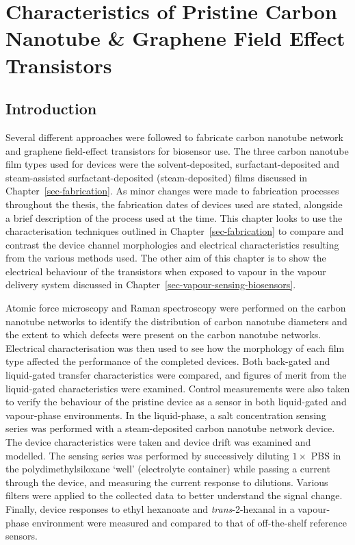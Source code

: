 \documentclass[
  a4paper,
]{scrbook}
\begin{document}

\hypertarget{sec-pristine-characteristics}{%
\chapter{Characteristics of Pristine Carbon Nanotube \& Graphene Field
Effect Transistors}\label{sec-pristine-characteristics}}

\hypertarget{introduction-3}{%
\section{Introduction}\label{introduction-3}}

Several different approaches were followed to fabricate carbon nanotube
network and graphene field-effect transistors for biosensor use. The
three carbon nanotube film types used for devices were the
solvent-deposited, surfactant-deposited and steam-assisted
surfactant-deposited (steam-deposited) films discussed in
Chapter~\ref{sec-fabrication}. As minor changes were made to fabrication
processes throughout the thesis, the fabrication dates of devices used
are stated, alongside a brief description of the process used at the
time. This chapter looks to use the characterisation techniques outlined
in Chapter~\ref{sec-fabrication} to compare and contrast the device
channel morphologies and electrical characteristics resulting from the
various methods used. The other aim of this chapter is to show the
electrical behaviour of the transistors when exposed to vapour in the
vapour delivery system discussed in
Chapter~\ref{sec-vapour-sensing-biosensors}.

Atomic force microscopy and Raman spectroscopy were performed on the
carbon nanotube networks to identify the distribution of carbon nanotube
diameters and the extent to which defects were present on the carbon
nanotube networks. Electrical characterisation was then used to see how
the morphology of each film type affected the performance of the
completed devices. Both back-gated and liquid-gated transfer
characteristics were compared, and figures of merit from the
liquid-gated characteristics were examined. Control measurements were
also taken to verify the behaviour of the pristine device as a sensor in
both liquid-gated and vapour-phase environments. In the liquid-phase, a
salt concentration sensing series was performed with a steam-deposited
carbon nanotube network device. The device characteristics were taken
and device drift was examined and modelled. The sensing series was
performed by successively diluting \(1 \times\) PBS in the
polydimethylsiloxane `well' (electrolyte container) while passing a
current through the device, and measuring the current response to
dilutions. Various filters were applied to the collected data to better
understand the signal change. Finally, device responses to ethyl
hexanoate and \emph{trans}-2-hexanal in a vapour-phase environment were
measured and compared to that of off-the-shelf reference sensors.
\end{document}
